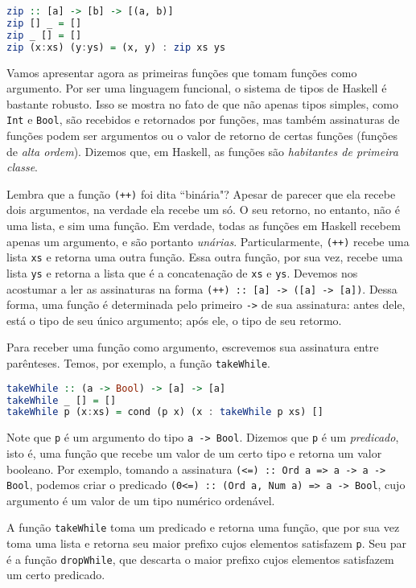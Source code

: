 \documentclass[a4paper]{article}
\begin{document}
\begin{lstlisting}[language=haskell, frame=single]
zip :: [a] -> [b] -> [(a, b)]
zip [] _ = []
zip _ [] = []
zip (x:xs) (y:ys) = (x, y) : zip xs ys
\end{lstlisting}

Vamos apresentar agora as primeiras funções que tomam funções como argumento.
Por ser uma linguagem funcional, o sistema de tipos de Haskell é bastante robusto.
Isso se mostra no fato de que não apenas tipos simples, como \texttt{Int} e \texttt{Bool}, são recebidos e retornados por funções, mas também assinaturas de funções podem ser argumentos ou o valor de retorno de certas funções (funções de \emph{alta ordem}).
Dizemos que, em Haskell, as funções são \emph{habitantes de primeira classe}.

Lembra que a função \texttt{(++)} foi dita ``binária"?
Apesar de parecer que ela recebe dois argumentos, na verdade ela recebe um só.
O seu retorno, no entanto, não é uma lista, e sim uma função.
Em verdade, todas as funções em Haskell recebem apenas um argumento, e são portanto \emph{unárias}.
Particularmente, \texttt{(++)} recebe uma lista \texttt{xs} e retorna uma outra função.
Essa outra função, por sua vez, recebe uma lista \texttt{ys} e  retorna a lista que é a concatenação de \texttt{xs} e \texttt{ys}.
Devemos nos acostumar a ler as assinaturas na forma \texttt{(++) :: [a] -> ([a] -> [a])}.
Dessa forma, uma função é determinada pelo primeiro \texttt{->} de sua assinatura: antes dele, está o tipo de seu único argumento; após ele, o tipo de seu retormo.

Para receber uma função como argumento, escrevemos sua assinatura entre parênteses.
Temos, por exemplo, a função \texttt{takeWhile}.

\begin{lstlisting}[language=haskell, frame=single]
takeWhile :: (a -> Bool) -> [a] -> [a]
takeWhile _ [] = []
takeWhile p (x:xs) = cond (p x) (x : takeWhile p xs) []
\end{lstlisting}

Note que \texttt{p} é um argumento do tipo \texttt{a -> Bool}.
Dizemos que \texttt{p} é um \emph{predicado}, isto é, uma função que recebe um valor de um certo tipo e retorna um valor booleano.
Por exemplo, tomando a assinatura \mbox{\texttt{(<=) :: Ord a => a -> a -> Bool}}, podemos criar o predicado \texttt{(0<=) :: (Ord a, Num a) => a -> Bool}, cujo argumento é um valor de um tipo numérico ordenável.

A função \texttt{takeWhile} toma um predicado e retorna uma função, que por sua vez toma uma lista e retorna seu maior prefixo cujos elementos satisfazem \texttt{p}.
Seu par é a função \texttt{dropWhile}, que descarta o maior prefixo cujos elementos satisfazem um certo predicado.
\end{document}
